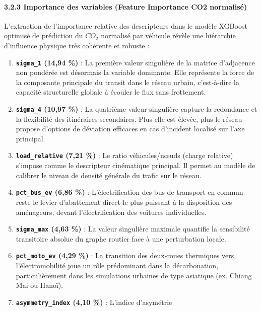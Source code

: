 \documentclass[10pt, a4paper]{article}
\providecommand{\tightlist}{}
\begin{document}
\newpage

\paragraph{3.2.3 Importance des variables (Feature Importance CO2
normalisé)}\label{importance-des-variables-feature-importance-co2-normalisuxe9}

L'extraction de l'importance relative des descripteurs dans le modèle
XGBoost optimisé de prédiction du \(CO_2\) normalisé par véhicule révèle
une hiérarchie d'influence physique très cohérente et robuste :

\begin{enumerate}
\def\labelenumi{\arabic{enumi}.}
\tightlist
\item
  \textbf{\texttt{sigma\_1} (14,94 \%)} : La première valeur singulière
  de la matrice d'adjacence non pondérée est désormais la variable
  dominante. Elle représente la force de la composante principale du
  transit dans le réseau urbain, c'est-à-dire la capacité structurelle
  globale à écouler le flux sans frottement.
\item
  \textbf{\texttt{sigma\_4} (10,97 \%)} : La quatrième valeur singulière
  capture la redondance et la flexibilité des itinéraires secondaires.
  Plus elle est élevée, plus le réseau propose d'options de déviation
  efficaces en cas d'incident localisé sur l'axe principal.
\item
  \textbf{\texttt{load\_relative} (7,21 \%)} : Le ratio véhicules/nœuds
  (charge relative) s'impose comme le descripteur cinématique principal.
  Il permet au modèle de calibrer le niveau de densité générale du
  trafic sur le réseau.
\item
  \textbf{\texttt{pct\_bus\_ev} (6,86 \%)} : L'électrification des bus
  de transport en commun reste le levier d'abattement direct le plus
  puissant à la disposition des aménageurs, devant l'électrification des
  voitures individuelles.
\item
  \textbf{\texttt{sigma\_max} (4,63 \%)} : La valeur singulière maximale
  quantifie la sensibilité transitoire absolue du graphe routier face à
  une perturbation locale.
\item
  \textbf{\texttt{pct\_moto\_ev} (4,29 \%)} : La transition des
  deux-roues thermiques vers l'électromobilité joue un rôle prédominant
  dans la décarbonation, particulièrement dans les simulations urbaines
  de type asiatique (ex. Chiang Mai ou Hanoï).
\item
  \textbf{\texttt{asymmetry\_index} (4,10 \%)} : L'indice d'asymétrie

\end{enumerate}
\end{document}
